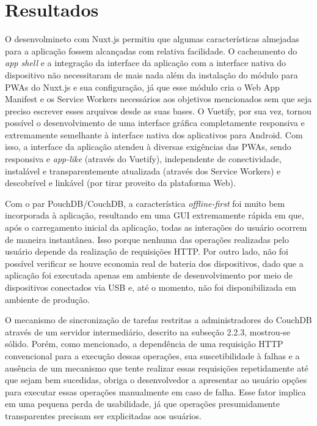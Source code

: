 \documentclass[
	article,			%
	11pt,				%
	oneside,			%
	a4paper,			%
	english,			%
	brazil,				%
	sumario=tradicional
	]{abntex2}
\begin{document}
% 

\section{Resultados}

O desenvolmineto com Nuxt.js permitiu que algumas características almejadas para a aplicação fossem alcançadas com relativa facilidade. O cacheamento do \textit{app shell} e a integração da interface da aplicação com a interface nativa do dispositivo não necessitaram de mais nada além da instalação do módulo para PWAs do Nuxt.js e sua configuração, já que esse módulo cria o Web App Manifest e os Service Workers necessários aos objetivos mencionados sem que seja preciso escrever esses arquivos desde as suas bases. O Vuetify, por sua vez, tornou possível o desenvolvimento de uma interface gráfica completamente responsiva e extremamente semelhante à interface nativa dos aplicativos para Android. Com isso, a interface da aplicação atendeu à diversas exigências das PWAs, sendo responsiva e \textit{app-like} (através do Vuetify), independente de conectividade, instalável e transparentemente atualizada (através dos Service Workers) e descobrível e linkável (por tirar proveito da plataforma Web).

Com o par PouchDB/CouchDB, a característica \textit{offline-first} foi muito bem incorporada à aplicação, resultando em uma GUI extremamente rápida em que, após o carregamento inicial da aplicação, todas as interações do usuário ocorrem de maneira instantânea. Isso porque nenhuma das operações realizadas pelo usuário depende da realização de requisições HTTP. Por outro lado, não foi possível verificar se houve economia real de bateria dos dispositivos, dado que a aplicação foi executada apenas em ambiente de desenvolvimento por meio de dispositivos conectados via USB e, até o momento, não foi disponibilizada em ambiente de produção.

O mecanismo de sincronização de tarefas restritas a administradores do CouchDB através de um servidor intermediário, descrito na subseção 2.2.3, mostrou-se sólido. Porém, como mencionado, a dependência de uma requisição HTTP convencional para a execução dessas operações, sua suscetibilidade à falhas e a ausência de um mecanismo que tente realizar essas requisições repetidamente até que sejam bem sucedidas, obriga o desenvolvedor a apresentar ao usuário opções para executar essas operações manualmente em caso de falha. Esse fator implica em uma pequena perda de usabilidade, já que operações presumidamente transparentes precisam ser explicitadas aos usuários.
\end{document}
